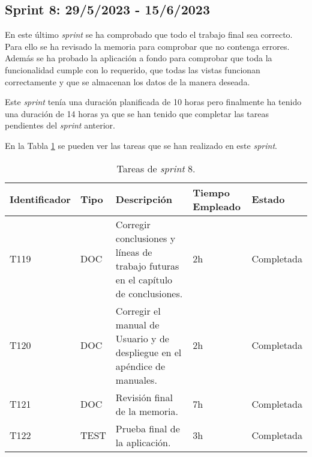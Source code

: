 \subsection{Sprint 8: 29/5/2023 - 15/6/2023}
En este último \textit{sprint} se ha comprobado que todo el trabajo final sea correcto. Para ello se ha revisado la memoria para comprobar que no contenga errores. Además se ha probado la aplicación a fondo para comprobar que toda la funcionalidad cumple con lo requerido, que todas las vistas funcionan correctamente y que se almacenan los datos de la manera deseada.

Este \textit{sprint} tenía una duración planificada de 10 horas pero finalmente ha tenido una duración de 14 horas ya que se han tenido que completar las tareas pendientes del \textit{sprint} anterior.

En la Tabla \ref{table:sprint8} se pueden ver las tareas que se han realizado en este \textit{sprint}.

\begin{table}[]
  \centering
\begin{tabular}{
  |p{}%
  |p{}%
  |p{}
  |p{}
  |p{}
  |%
  }
  \hline
  \textbf{Identificador} & \textbf{Tipo} & \textbf{Descripción}                                             & \textbf{Tiempo Empleado} & \textbf{Estado} \\ \hline

  
  T119                   & DOC           & Corregir conclusiones y líneas de trabajo futuras en el capítulo de conclusiones.           & 2h                       & Completada      \\ \hline

  T120                   & DOC           & Corregir el manual de Usuario y de despliegue en el apéndice de manuales.        & 2h                       & Completada      \\ \hline


  T121                   & DOC           & Revisión final de la memoria.       & 7h                       & Completada      \\ \hline

  T122                   & TEST           & Prueba final de la aplicación.       & 3h                       & Completada      \\ \hline

\end{tabular}
\caption{Tareas de \textit{sprint} 8.}
\label{table:sprint8}
\end{table}












